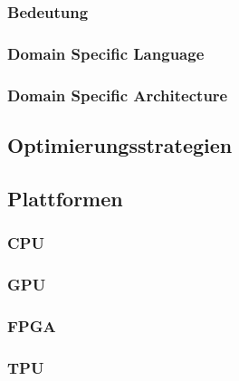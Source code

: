 \subsubsection{Bedeutung}

\subsubsection{Domain Specific Language}

\subsubsection{Domain Specific Architecture}

\newpage

\subsection{Optimierungsstrategien}

\newpage

\subsection{Plattformen}

\subsubsection{CPU}

\subsubsection{GPU}

\subsubsection{FPGA}

\subsubsection{TPU}

\newpage